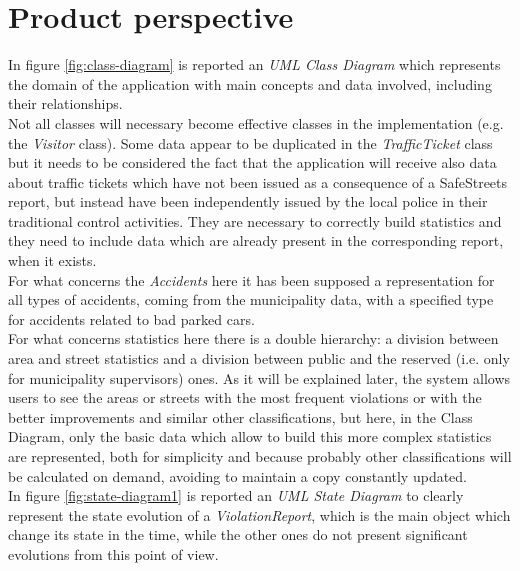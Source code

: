 \documentclass[a4paper]{report}
\begin{document}
\section{Product perspective}
In figure \ref{fig:class-diagram} is reported an \textit{UML Class Diagram} which represents the domain of the application with main concepts and data involved, including their relationships.\\
Not all classes will necessary become effective classes in the implementation (e.g. the \textit{Visitor} class).
Some data appear to be duplicated in the \textit{TrafficTicket} class but it needs to be considered the fact that the application will receive also data about traffic tickets which have not been issued as a consequence of a SafeStreets report, but instead have been independently issued by the local police in their traditional control activities. They are necessary to correctly build statistics and they need to include data which are already present in the corresponding report, when it exists.\\
For what concerns the \textit{Accidents} here it has been supposed a representation for all types of accidents, coming from the municipality data, with a specified type for accidents related to bad parked cars.\\
For what concerns statistics here there is a double hierarchy: a division between area and street statistics and a division between public and the reserved (i.e. only for municipality supervisors) ones. As it will be explained later, the system allows users to see the areas or streets with the most frequent violations or with the better improvements and similar other classifications, but here, in the Class Diagram, only the basic data which allow to build this more complex statistics are represented, both for simplicity and because probably other classifications will be calculated on demand, avoiding to maintain a copy constantly updated.  \\
In figure \ref{fig:state-diagram1} is reported an \textit{UML State Diagram} to clearly represent the state evolution of a \textit{ViolationReport}, which is the main object which change its state in the time, while the other ones do not present significant evolutions from this point of view.
\end{document}
